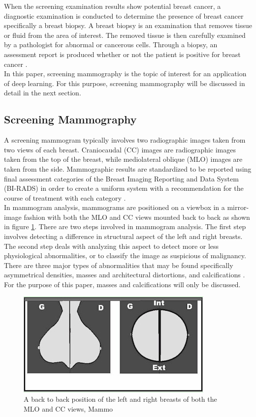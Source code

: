 	When the screening examination results show potential breast cancer, a diagnostic examination is conducted to determine the presence of breast cancer specifically a breast biopsy. A breast biopsy is an examination that removes tissue or fluid from the area of interest. The removed tissue is then carefully examined by a pathologist for abnormal or cancerous cells. Through a biopsy, an assessment report is produced whether or not the patient is positive for breast cancer \cite{breastBiopsy}. \\

	In this paper, screening mammography is the topic of interest for an application of deep learning. For this purpose, screening mammography will be discussed in detail in the next section.

\subsection{Screening Mammography}
\qquad A screening mammogram typically involves two radiographic images taken from two views of each breast. Craniocaudal (CC) images are radiographic images taken from the top of the breast, while mediolateral oblique (MLO) images are taken from the side. Mammographic results are standardized to be reported using final assessment categories of the Breast Imaging Reporting and Data System (BI-RADS) in order to create a uniform system with a recommendation for the course of treatment with each category \cite{breastCancerScreeningAndDiagnosis}. \\

	In mammogram analysis, mammograms are positioned on a viewbox in a mirror-image fashion with both the MLO and CC views mounted back to back as shown in figure \ref{fig:mammogramMirror}. There are two steps involved in mammogram analysis. The first step involves detecting a difference in structural aspect of the left and right breasts. The second step deals with analyzing this aspect to detect more or less physiological abnormalities, or to classify the image as suspicious of malignancy. There are three major types of abnormalities that may be found specifically asymmetrical densities, masses and architectural distortions, and calcifications \cite{mammogramViews}. For the purpose of this paper, masses and calcifications will only be discussed. 

\begin{figure}[h]
	\centering
  	\includegraphics[scale=1.0]{images/mammogramMirror.png}
	\caption{A back to back position of the left and right breasts of both the MLO and CC views, Mammo}
  	\label{fig:mammogramMirror}
\end{figure}

